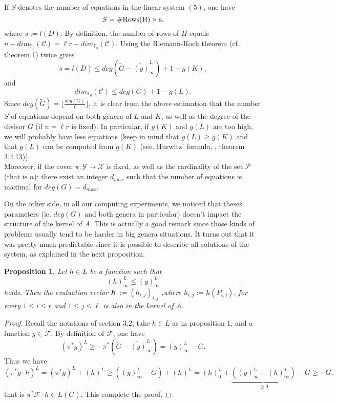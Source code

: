 \documentclass[10pt]{article}
\newtheorem{prop1}{Proposition}[]
\newcommand{\s}{\vspace{0.3cm}}
\newcommand{\cd}{\cdot}
\newcommand{\fq}{\mathbb{F}_q}
\newcommand{\X}{\mathcal{X}}
\newcommand{\Y}{\mathcal{Y}}
\newcommand{\PR}{\mathcal{P}}
\begin{document}
\s 

If $S$ denotes the number of equations in the linear system $(5)$, one have 
\[S = \#\rm{Rows}(H) \times s,\]
where $s := l(D)$. By definition, the number of rows of $H$ equals $n-dim_{\fq}(\mathcal{C})= \ell r - dim_{\fq}(\mathcal{C})$. Using the Riemann-Roch theorem (cf. theorem 1) twice gives 
\[s = l(D) \leq deg\left(\tilde{G}-\widetilde{(y)}^L_{\infty}\right) +1 - g(K) ,\]
and
\[dim_{\fq}(\mathcal{C}) \leq deg(G)+1-g(L).\]
Since $deg(\tilde{G}) = \lfloor \frac{deg(G)}{\ell} \rfloor$, it is clear from the above estimation that the number $S$ of equations depend on both genera of $L$ and $K$, as well as the degree of the divisor $G$ (if $n=\ell r$ is fixed). In particular, if $g(K)$ and $g(L)$ are too high, we will probably have less equations (keep in mind that $g(L) \geq g(K)$ and that $g(L)$ can be computed from $g(K)$ (see. Hurwitz' formula, \cite{Sti}, theorem 3.4.13)). \\
Moreover, if the cover $\pi : \Y \rightarrow \X$ is fixed, as well as the cardinality of the set $\PR$ (that is $n$); there exist an integer $d_{max}$ such that the number of equations is maximal for $deg(G)=d_{max}$. 

\s

On the other side, in all our computing experiments, we noticed that theses parameters (ie. $deg(G)$ and both genera in particular) doesn't impact the structure of the kernel of $A$. This is actually a good remark since those kinds of problems usually tend to be harder in big genera situations. It turns out that it was pretty much predictable since it is possible to describe all solutions of the system, as explained in the next proposition. 

\s

\begin{prop1}
Let $h \in L$ be a function such that 
\[ (h)^L_{\infty} \leq (y)^L_{\infty}\]
holds. Then the evaluation vector \textbf{h} $ := (h_{i,j})_{i,j}$ ,where $h_{i,j} := h(P_{i,j})$, for every $1 \leq i \leq r$ and $1 \leq j \leq \ell$ is also in the kernel of $A$.
\end{prop1}

\s

\begin{proof}
Recall the notations of section 3.2, take $h \in L$ as in proposition 1, and a function $g \in \mathcal{F}$. By definition of $\mathcal{F}$, one have 
\[(\pi^*g)^L \geq -\pi^*\left(\tilde{G}-\widetilde{(y)}^L_{\infty}\right) = (y)^L_{\infty} - G.\]
Thus we have 
\[(\pi^*g \cd h)^L = (\pi^*g)^L  + (h)^L \geq  ((y)^L_{\infty} - G)+(h)^L = (h)^L_0 + \underbrace{((y)^L_{\infty}-(h)^L_{\infty})}_{\geq 0} - G \geq -G,\]
that is $\pi^*\mathcal{F}\cd h \in L(G)$. This complete the proof.

\end{proof}
\end{document}
